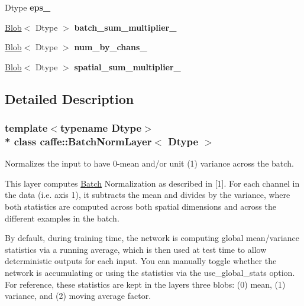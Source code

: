 \begin{DoxyCompactItemize}
\item 
Dtype {\bfseries eps\+\_\+}\hypertarget{classcaffe_1_1BatchNormLayer_a578bf09a12d0ad6b6fb51600a1a1feb6}{}\label{classcaffe_1_1BatchNormLayer_a578bf09a12d0ad6b6fb51600a1a1feb6}

\item 
\hyperlink{classcaffe_1_1Blob}{Blob}$<$ Dtype $>$ {\bfseries batch\+\_\+sum\+\_\+multiplier\+\_\+}\hypertarget{classcaffe_1_1BatchNormLayer_a04b912c9e47737b4c91bf97bfd34c9ae}{}\label{classcaffe_1_1BatchNormLayer_a04b912c9e47737b4c91bf97bfd34c9ae}

\item 
\hyperlink{classcaffe_1_1Blob}{Blob}$<$ Dtype $>$ {\bfseries num\+\_\+by\+\_\+chans\+\_\+}\hypertarget{classcaffe_1_1BatchNormLayer_a18b26f0942f10d4de8562aca9c68e38d}{}\label{classcaffe_1_1BatchNormLayer_a18b26f0942f10d4de8562aca9c68e38d}

\item 
\hyperlink{classcaffe_1_1Blob}{Blob}$<$ Dtype $>$ {\bfseries spatial\+\_\+sum\+\_\+multiplier\+\_\+}\hypertarget{classcaffe_1_1BatchNormLayer_a1649265a7921b2fee4e99dd26069e74a}{}\label{classcaffe_1_1BatchNormLayer_a1649265a7921b2fee4e99dd26069e74a}

\end{DoxyCompactItemize}


\subsection{Detailed Description}
\subsubsection*{template$<$typename Dtype$>$\\*
class caffe\+::\+Batch\+Norm\+Layer$<$ Dtype $>$}

Normalizes the input to have 0-\/mean and/or unit (1) variance across the batch. 

This layer computes \hyperlink{classcaffe_1_1Batch}{Batch} Normalization as described in \mbox{[}1\mbox{]}. For each channel in the data (i.\+e. axis 1), it subtracts the mean and divides by the variance, where both statistics are computed across both spatial dimensions and across the different examples in the batch.

By default, during training time, the network is computing global mean/variance statistics via a running average, which is then used at test time to allow deterministic outputs for each input. You can manually toggle whether the network is accumulating or using the statistics via the use\+\_\+global\+\_\+stats option. For reference, these statistics are kept in the layer\textquotesingle{}s three blobs\+: (0) mean, (1) variance, and (2) moving average factor.

